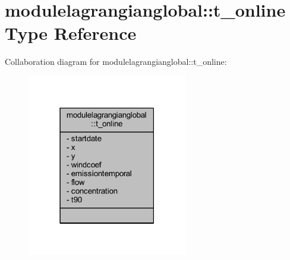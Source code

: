 \hypertarget{structmodulelagrangianglobal_1_1t__online}{}\section{modulelagrangianglobal\+:\+:t\+\_\+online Type Reference}
\label{structmodulelagrangianglobal_1_1t__online}


Collaboration diagram for modulelagrangianglobal\+:\+:t\+\_\+online\+:\nopagebreak
\begin{figure}[H]
\begin{center}
\leavevmode
\includegraphics[width=198pt]{structmodulelagrangianglobal_1_1t__online__coll__graph}
\end{center}
\end{figure}
